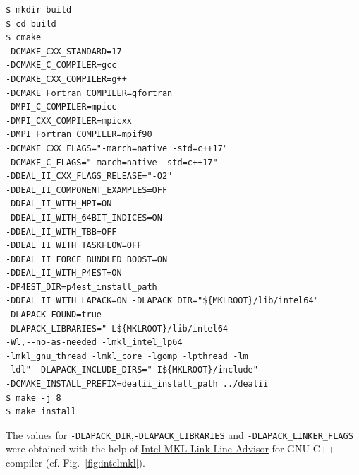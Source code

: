 \begin{verbatim}
$ mkdir build
$ cd build
$ cmake
-DCMAKE_CXX_STANDARD=17
-DCMAKE_C_COMPILER=gcc 
-DCMAKE_CXX_COMPILER=g++
-DCMAKE_Fortran_COMPILER=gfortran
-DMPI_C_COMPILER=mpicc 
-DMPI_CXX_COMPILER=mpicxx 
-DMPI_Fortran_COMPILER=mpif90
-DCMAKE_CXX_FLAGS="-march=native -std=c++17"
-DCMAKE_C_FLAGS="-march=native -std=c++17"
-DDEAL_II_CXX_FLAGS_RELEASE="-O2"
-DDEAL_II_COMPONENT_EXAMPLES=OFF
-DDEAL_II_WITH_MPI=ON
-DDEAL_II_WITH_64BIT_INDICES=ON
-DDEAL_II_WITH_TBB=OFF
-DDEAL_II_WITH_TASKFLOW=OFF 
-DDEAL_II_FORCE_BUNDLED_BOOST=ON
-DDEAL_II_WITH_P4EST=ON 
-DP4EST_DIR=p4est_install_path 
-DDEAL_II_WITH_LAPACK=ON -DLAPACK_DIR="${MKLROOT}/lib/intel64"
-DLAPACK_FOUND=true
-DLAPACK_LIBRARIES="-L${MKLROOT}/lib/intel64
-Wl,--no-as-needed -lmkl_intel_lp64
-lmkl_gnu_thread -lmkl_core -lgomp -lpthread -lm
-ldl" -DLAPACK_INCLUDE_DIRS="-I${MKLROOT}/include" 
-DCMAKE_INSTALL_PREFIX=dealii_install_path ../dealii
$ make -j 8
$ make install
\end{verbatim}
The values for \verb|-DLAPACK_DIR|,\verb|-DLAPACK_LIBRARIES| and \verb|-DLAPACK_LINKER_FLAGS| were obtained with the help of \href{https://software.intel.com/en-us/articles/intel-mkl-link-line-advisor}{Intel MKL Link Line Advisor} for GNU C++ compiler (cf. Fig.~\ref{fig:intelmkl}).\\ 
